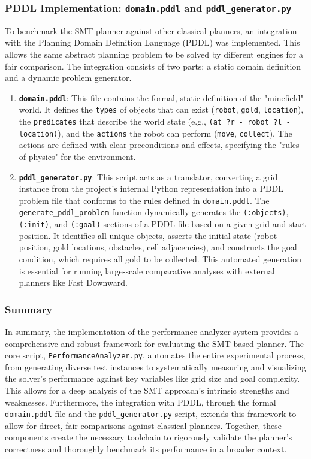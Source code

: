 \documentclass[12pt, a4paper, oneside]{report} %
\begin{document}
\subsubsection{PDDL Implementation: \texttt{domain.pddl} and \texttt{pddl\_generator.py}}

To benchmark the SMT planner against other classical planners, an integration with the Planning Domain Definition Language (PDDL) was implemented. This allows the same abstract planning problem to be solved by different engines for a fair comparison. The integration consists of two parts: a static domain definition and a dynamic problem generator.
\begin{enumerate}
    \item \textbf{\texttt{domain.pddl}}: This file contains the formal, static definition of the "minefield" world. It defines the \texttt{types} of objects that can exist (\texttt{robot}, \texttt{gold}, \texttt{location}), the \texttt{predicates} that describe the world state (e.g., \texttt{(at ?r - robot ?l - location)}), and the \texttt{actions} the robot can perform (\texttt{move}, \texttt{collect}). The actions are defined with clear preconditions and effects, specifying the "rules of physics" for the environment.
    \item \textbf{\texttt{pddl\_generator.py}}: This script acts as a translator, converting a grid instance from the project's internal Python representation into a PDDL problem file that conforms to the rules defined in \texttt{domain.pddl}. The \texttt{generate\_pddl\_problem} function dynamically generates the \texttt{(:objects)}, \texttt{(:init)}, and \texttt{(:goal)} sections of a PDDL file based on a given grid and start position. It identifies all unique objects, asserts the initial state (robot position, gold locations, obstacles, cell adjacencies), and constructs the goal condition, which requires all gold to be collected. This automated generation is essential for running large-scale comparative analyses with external planners like Fast Downward.
\end{enumerate}

\subsubsection{Summary}
In summary, the implementation of the performance analyzer system provides a comprehensive and robust framework for evaluating the SMT-based planner. The core script, \texttt{PerformanceAnalyzer.py}, automates the entire experimental process, from generating diverse test instances to systematically measuring and visualizing the solver's performance against key variables like grid size and goal complexity. This allows for a deep analysis of the SMT approach's intrinsic strengths and weaknesses. Furthermore, the integration with PDDL, through the formal \texttt{domain.pddl} file and the \texttt{pddl\_generator.py} script, extends this framework to allow for direct, fair comparisons against classical planners. Together, these components create the necessary toolchain to rigorously validate the planner's correctness and thoroughly benchmark its performance in a broader context.
\end{document}
